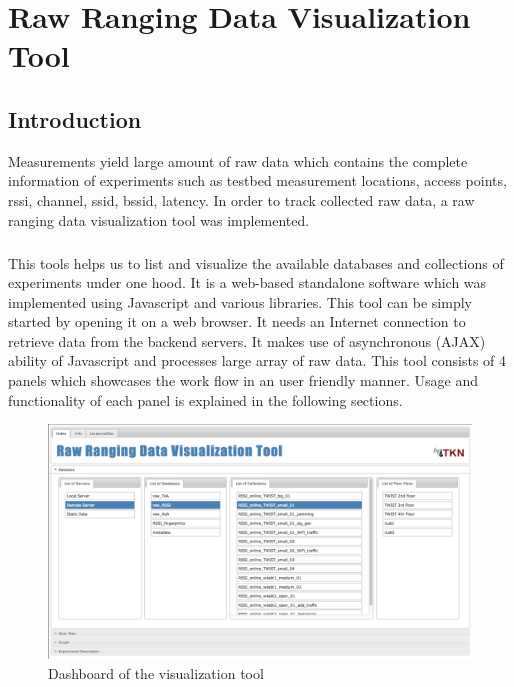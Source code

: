 \documentclass[11pt,a4paper,headinclude,footinclude,chapterprefix=on]{scrreprt}
\begin{document}
\chapter{Raw Ranging Data Visualization Tool} 
\section*{Introduction} Measurements yield large amount of raw data which contains the complete information of experiments such as testbed measurement locations, access points, rssi, channel, ssid, bssid, latency. In order to track collected raw data, a raw ranging data visualization tool was implemented. 

\paragraph{}This tools helps us to list and visualize the available databases and collections of experiments under one hood. It is a web-based standalone software which was implemented using Javascript and various libraries. This tool can be simply started by opening it on a web browser. It needs an Internet connection to retrieve data from the backend servers. It makes use of asynchronous (AJAX) ability of Javascript and processes large array of raw data. This tool consists of 4 panels which showcases the work flow in an user friendly manner. Usage and functionality of each panel is explained in the following sections. 
\begin{figure}
	[!h] \centering 
	\includegraphics[width=13cm]{Images/tool_db.png} \caption{Dashboard of the visualization tool} \label{fig:tool:db} 
\end{figure}
\end{document}
